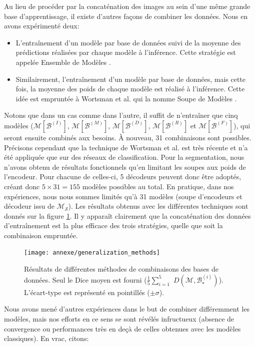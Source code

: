 Au lieu de procéder par la concaténation des images au sein d'une même grande base d'apprentissage, il existe d'autres façons de combiner les données. Nous en avons expérimenté deux:
\begin{itemize}
	\item L'entraînement d'un modèle par base de données suivi de la moyenne des prédictions réalisées par chaque modèle à l'inférence. Cette stratégie est appelée \og Ensemble de Modèles \fg.
	\item Similairement, l'entraînement d'un modèle par base de données, mais cette fois, la moyenne des poids de chaque modèle est réalisé à l'inférence. Cette idée est empruntée à Wortsman et al. \cite{wortsman2022model} qui la nomme \og Soupe de Modèles \fg.
\end{itemize}
Notons que dans un cas comme dans l'autre, il suffit de n'entraîner que cinq modèles ($\mathcal{M}[\mathcal{B}^{(I)}]$, $\mathcal{M}[\mathcal{B}^{(M)}]$, $\mathcal{M}[\mathcal{B}^{(D)}]$, $\mathcal{M}[\mathcal{B}^{(R)}]$ et $ \mathcal{M}[\mathcal{B}^{(F)}]$), qui seront ensuite combinés aux besoins. À nouveau, 31 combinaisons sont possibles. Précisons cependant que la technique de Wortsman et al. est très récente et n'a été appliquée que sur des réseaux de classification. Pour la segmentation, nous n'avons obtenu de résultats fonctionnels qu'en limitant les \og soupes \fg aux poids de l'encodeur. Pour chacune de celles-ci, 5 décodeurs peuvent donc être adoptés, créant donc $5 \times 31 = 155$ modèles possibles au total. En pratique, dans nos expériences, nous nous sommes limités qu'à 31 modèles (soupe d'encodeurs et décodeur issu de $\mathcal{M}_\mathcal{S}$). Les résultats obtenus avec les différentes techniques sont donnés sur la figure \ref{fig:GeneralizationResultsSoupEnsembleCombination}. Il y apparaît clairement que la concaténation des données d'entraînement est la plus efficace des trois stratégies, quelle que soit la combinaison empruntée.
\begin{figure}
	\centering
	\texttt{[image: annexe/generalization\_methods]}
	\caption{Résultats de différentes méthodes de combinaisons des bases de données. Seul le Dice moyen est fourni ($\frac{1}{5} \sum_{i=1}^{5}$ $D(\mathcal{M}, \mathcal{B}^{(i)}_\star)$). L'écart-type est représenté en pointillés ($\pm \sigma$).}
	\label{fig:GeneralizationResultsSoupEnsembleCombination}
\end{figure}
Nous avons mené d'autres expériences dans le but de combiner différemment les modèles, mais nos efforts en ce sens se sont révélés infructueux (absence de convergence ou performances très en deçà de celles obtenues avec les modèles classiques). En vrac, citons:
